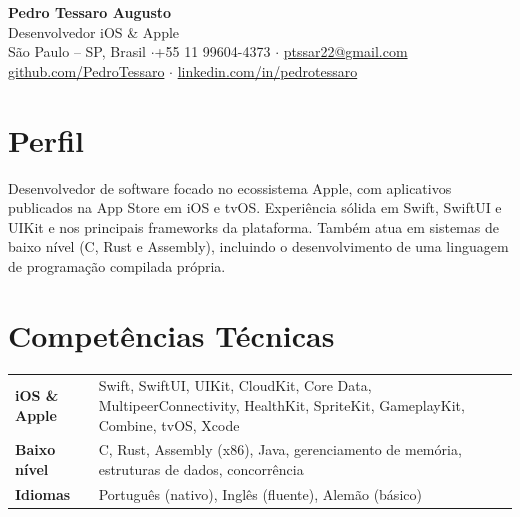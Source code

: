 \documentclass[11pt,a4paper]{article}
\begin{document}
\begin{center}
  {\Huge\bfseries Pedro Tessaro Augusto}\\[3pt]
  {\large\color{accent} Desenvolvedor iOS \& Apple}\\[6pt]
  {\color{muted}\small
    São Paulo -- SP, Brasil \quad$\cdot$\quad +55 11 99604-4373 \quad$\cdot$\quad
    \href{mailto:ptssar22@gmail.com}{ptssar22@gmail.com}\\[2pt]
    \href{https://github.com/PedroTessaro}{github.com/PedroTessaro} \quad$\cdot$\quad
    \href{https://linkedin.com/in/pedrotessaro}{linkedin.com/in/pedrotessaro}
  }
\end{center}
\vspace{2pt}

\section{Perfil}
Desenvolvedor de software focado no ecossistema Apple, com aplicativos publicados na App Store
em iOS e tvOS. Experiência sólida em Swift, SwiftUI e UIKit e nos principais frameworks da
plataforma. Também atua em sistemas de baixo nível (C, Rust e Assembly), incluindo o
desenvolvimento de uma linguagem de programação compilada própria.

\section{Competências Técnicas}
\begin{tabularx}{\textwidth}{@{}l X@{}}
  \textbf{iOS \& Apple}      & Swift, SwiftUI, UIKit, CloudKit, Core Data, MultipeerConnectivity, HealthKit, SpriteKit, GameplayKit, Combine, tvOS, Xcode \\[3pt]
  \textbf{Baixo nível}       & C, Rust, Assembly (x86), Java, gerenciamento de memória, estruturas de dados, concorrência \\[3pt]
  \textbf{Idiomas}           & Português (nativo), Inglês (fluente), Alemão (básico) \\
\end{tabularx}

\end{document}
